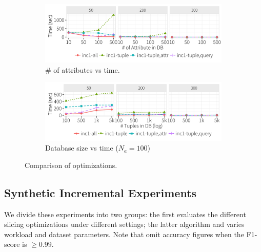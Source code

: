  \begin{figure}[h]
    \vspace*{-.1in}
    \centering
    \begin{subfigure}[t]{.49\textwidth}
    \includegraphics[width = .99\columnwidth]{figures/attr_time}
    \vspace*{-.1in}
    \caption{\# of attributes vs time.}
    \label{f:attr} 
    \end{subfigure}
    \begin{subfigure}[t]{.49\textwidth}
    \includegraphics[width = .99\columnwidth]{figures/attr100_time}
    \vspace*{-.1in}
    \caption{Database size vs time ($N_a = 100$)}
    \label{f:attr100} 
    \end{subfigure}
    \vspace*{-.1in}
    \caption{Comparison of optimizations.}
  \end{figure}
  

















\subsection{Synthetic Incremental Experiments}
\label{sec:experiments:synth}
We divide these experiments into two groups: the first evaluates the different slicing optimizations under different settings; 
the latter algorithm and varies workload and dataset parameters.
Note that omit accuracy figures when the F1-score is $\ge 0.99$.

